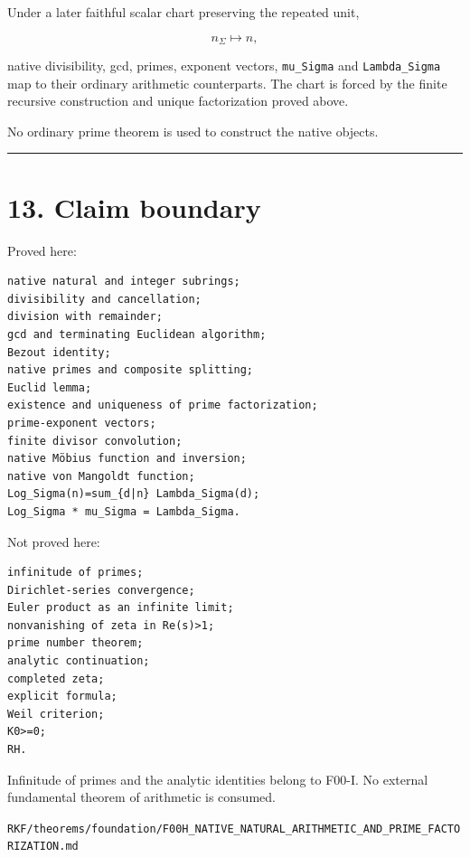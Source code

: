 Under a later faithful scalar chart preserving the repeated unit,

\[
n_\Sigma\mapsto n,
\]

native divisibility, gcd, primes, exponent vectors, \texttt{mu\_Sigma} and
\texttt{Lambda\_Sigma} map to their ordinary arithmetic counterparts. The chart is
forced by the finite recursive construction and unique factorization proved
above.

No ordinary prime theorem is used to construct the native objects.

\begin{center}\rule{0.5\linewidth}{0.5pt}\end{center}

\hypertarget{claim-boundary}{%
\section{13. Claim boundary}\label{claim-boundary}}

Proved here:

\begin{verbatim}
native natural and integer subrings;
divisibility and cancellation;
division with remainder;
gcd and terminating Euclidean algorithm;
Bezout identity;
native primes and composite splitting;
Euclid lemma;
existence and uniqueness of prime factorization;
prime-exponent vectors;
finite divisor convolution;
native Möbius function and inversion;
native von Mangoldt function;
Log_Sigma(n)=sum_{d|n} Lambda_Sigma(d);
Log_Sigma * mu_Sigma = Lambda_Sigma.
\end{verbatim}

Not proved here:

\begin{verbatim}
infinitude of primes;
Dirichlet-series convergence;
Euler product as an infinite limit;
nonvanishing of zeta in Re(s)>1;
prime number theorem;
analytic continuation;
completed zeta;
explicit formula;
Weil criterion;
K0>=0;
RH.
\end{verbatim}

Infinitude of primes and the analytic identities belong to F00-I. No external
fundamental theorem of arithmetic is consumed.

\begin{flushright}\small\texttt{RKF/theorems/foundation/F00H\_NATIVE\_NATURAL\_ARITHMETIC\_AND\_PRIME\_FACTORIZATION.md}\end{flushright}
